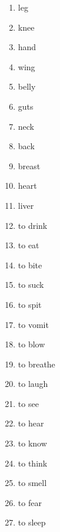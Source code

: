 \begin{multicols}{2}
\begin{enumerate}
\item   leg 

\item   knee 

\item   hand 

\item   wing 

\item   belly 

\item   guts 

\item   neck 

\item   back 

\item   breast 

\item   heart 

\item   liver 

\item   to drink 

\item   to eat 

\item   to bite 

\item   to suck 

\item   to spit 

\item   to vomit 

\item   to blow 

\item   to breathe 

\item   to laugh 

\item   to see 

\item   to hear 

\item   to know 

\item   to think 

\item   to smell 

\item   to fear 

\item   to sleep 


\end{enumerate}
\end{multicols}
